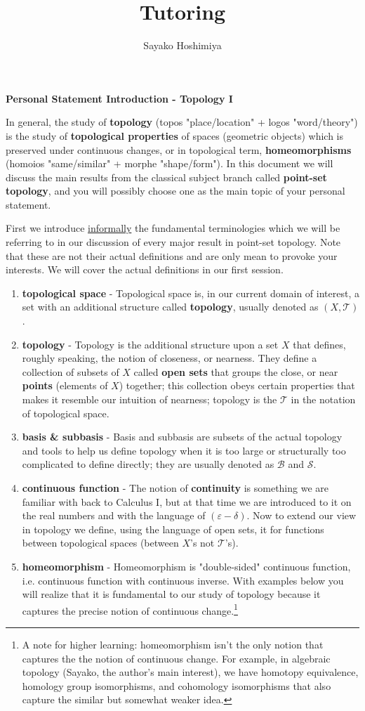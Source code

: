 \documentclass[10pt]{article}
\title{Tutoring}
\author{Sayako Hoshimiya}
\begin{document}
\def \setminus {\mathbin{\backslash}}
\begin{center}\textbf{\Large Personal Statement Introduction - Topology I}\end{center}

In general, the study of \textbf{topology} (topos "place/location" + logos "word/theory") is the study of \textbf{topological properties} of spaces (geometric objects) which is preserved under continuous changes, or in topological term, \textbf{homeomorphisms} (homoios "same/similar" + morphe "shape/form"). In this document we will discuss the main results from the classical subject branch called \textbf{point-set topology}, and you will possibly choose one as the main topic of your personal statement.

First we introduce \underline{informally} the fundamental terminologies which we will be referring to in our discussion of every major result in point-set topology. Note that these are not their actual definitions and are only mean to provoke your interests. We will cover the actual definitions in our first session.
\begin{enumerate}
\item \textbf{topological space} - Topological space is, in our current domain of interest, a set with an additional structure called \textbf{topology}, usually denoted as $(X,\mathcal{T})$.
\item \textbf{topology} - Topology is the additional structure upon a set $X$ that defines, roughly speaking, the notion of closeness, or nearness. They define a collection of subsets of $X$ called \textbf{open sets} that groups the close, or near \textbf{points} (elements of $X$) together; this collection obeys certain properties that makes it resemble our intuition of nearness; topology is the $\mathcal{T}$ in the notation of topological space.
\item \textbf{basis \& subbasis} - Basis and subbasis are subsets of the actual topology and tools to help us define topology when it is too large or structurally too complicated to define directly; they are usually denoted as $\mathcal{B}$ and $\mathcal{S}$.
\item \textbf{continuous function} - The notion of \textbf{continuity} is something we are familiar with back to Calculus I, but at that time we are introduced to it on the real numbers and with the language of $(\varepsilon-\delta)$. Now to extend our view in topology we define, using the language of open sets, it for functions between topological spaces (between $X$'s not $\mathcal{T}$'s).
\item \textbf{homeomorphism} - Homeomorphism is "double-sided" continuous function, i.e. continuous function with continuous inverse. With examples below you will realize that it is fundamental to our study of topology because it captures the precise notion of continuous change.\footnote{A note for higher learning: homeomorphism isn't the only notion that captures the the notion of continuous change. For example, in algebraic topology (Sayako, the author's main interest), we have homotopy equivalence, homology group isomorphisms, and cohomology isomorphisms that also capture the similar but somewhat weaker idea.}
\end{enumerate}
\end{document}
